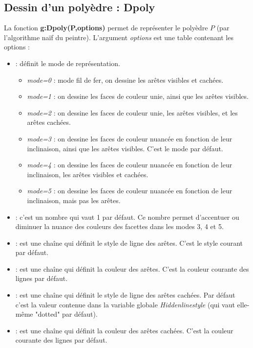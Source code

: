 \documentclass[%
10pt,%
a4paper,%
french,%
]%
{article}%
\begin{document}
\subsection{Dessin d'un polyèdre : Dpoly}

La fonction \textbf{g:Dpoly(P,options)} permet de représenter le polyèdre $P$ (par l'algorithme naïf du peintre). L'argument \emph{options} est une table contenant les options :
\begin{itemize}
    \item {} : définit le mode de représentation.
        \begin{itemize}
            \item \emph{mode=0} : mode fil de fer, on dessine les arêtes visibles et cachées.
            \item \emph{mode=1} : on dessine les faces de couleur unie, ainsi que les arêtes visibles.
            \item \emph{mode=2} : on dessine les faces de couleur unie, les arêtes visibles, et les arêtes cachées.
            \item \emph{mode=3} : on dessine les faces de couleur nuancée en fonction de leur inclinaison, ainsi que les arêtes visibles. C'est le mode par défaut.
            \item \emph{mode=4} : on dessine les faces de couleur nuancée en fonction de leur inclinaison, les arêtes visibles et cachées.
            \item \emph{mode=5} :  on dessine les faces de couleur nuancée en fonction de leur inclinaison, mais pas les arêtes.
        \end{itemize}
        \item {} : c'est un nombre qui vaut 1 par défaut. Ce nombre permet d'accentuer ou diminuer la nuance des couleurs des facettes dans les modes 3, 4 et 5.
        \item {} : est une chaîne qui définit le style de ligne des arêtes. C'est le style courant par défaut.
        \item {} : est une chaîne qui définit la couleur des arêtes. C'est la couleur courante des lignes par défaut.
        \item {} : est une chaîne qui définit le style de ligne des arêtes cachées. Par défaut c'est la valeur contenue dans la variable globale \emph{Hiddenlinestyle} (qui vaut elle-même "dotted" par défaut).
        \item {} : est une chaîne qui définit la couleur des arêtes cachées. C'est la couleur courante des lignes par défaut.

\end{itemize}
\end{document}
